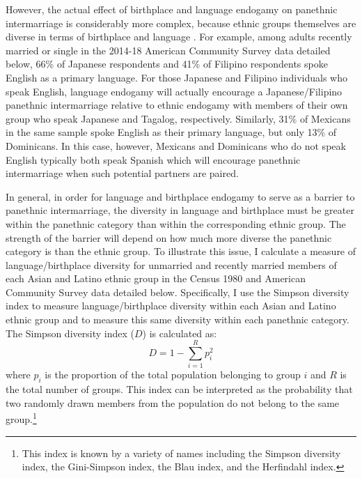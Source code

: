 \documentclass[11pt,]{article}
\begin{document}
However, the actual effect of birthplace and language endogamy on panethnic intermarriage is considerably more complex, because ethnic groups themselves are diverse in terms of birthplace and language \citep{jimenez_how_2015}. For example, among adults recently married or single in the 2014-18 American Community Survey data detailed below, 66\% of Japanese respondents and 41\% of Filipino respondents spoke English as a primary language. For those Japanese and Filipino individuals who speak English, language endogamy will actually encourage a Japanese/Filipino panethnic intermarriage relative to ethnic endogamy with members of their own group who speak Japanese and Tagalog, respectively. Similarly, 31\% of Mexicans in the same sample spoke English as their primary language, but only 13\% of Dominicans. In this case, however, Mexicans and Dominicans who do not speak English typically both speak Spanish which will encourage panethnic intermarriage when such potential partners are paired.

In general, in order for language and birthplace endogamy to serve as a barrier to panethnic intermarriage, the diversity in language and birthplace must be greater within the panethnic category than within the corresponding ethnic group. The strength of the barrier will depend on how much more diverse the panethnic category is than the ethnic group. To illustrate this issue, I calculate a measure of language/birthplace diversity for unmarried and recently married members of each Asian and Latino ethnic group in the Census 1980 and American Community Survey data detailed below. Specifically, I use the Simpson diversity index \citep{simpson_measurement_1949} to measure language/birthplace diversity within each Asian and Latino ethnic group and to measure this same diversity within each panethnic category. The Simpson diversity index (\(D\)) is calculated as: \[D=1-\sum_{i=1}^R p_i^2\] where \(p_i\) is the proportion of the total population belonging to group \(i\) and \(R\) is the total number of groups. This index can be interpreted as the probability that two randomly drawn members from the population do not belong to the same group.\footnote{This index is known by a variety of names including the Simpson diversity index, the Gini-Simpson index, the Blau index, and the Herfindahl index.}
\end{document}
